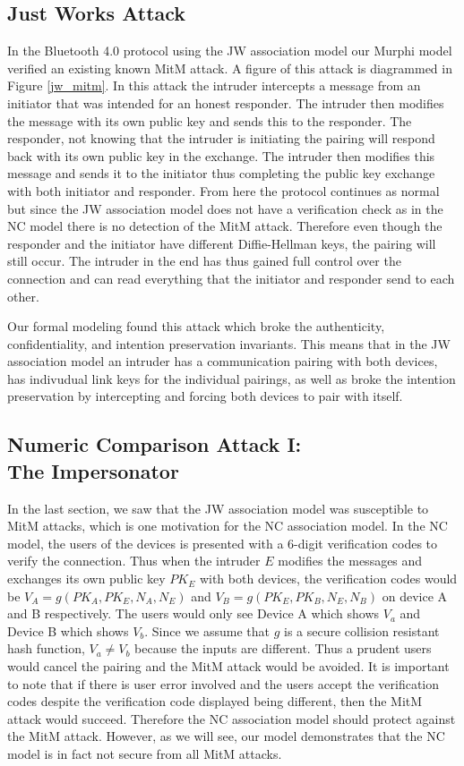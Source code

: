 \documentclass{acm_proc_article-sp}
\begin{document}
\subsection{Just Works Attack}
In the Bluetooth 4.0 protocol using the JW association model our Murphi model verified an existing known MitM attack. A figure of this attack is diagrammed in Figure \ref{jw_mitm}. In this attack the intruder intercepts a message from an initiator that was intended for an honest responder. The intruder then modifies the message with its own public key and sends this to the responder. The responder, not knowing that the intruder is initiating the pairing will respond back with its own public key in the exchange. The intruder then modifies this message and sends it to the initiator thus completing the public key exchange with both initiator and responder. From here the protocol continues as normal but since the JW association model does not have a verification check as in the NC model there is no detection of the MitM attack. Therefore even though the responder and the initiator have different Diffie-Hellman keys, the pairing will still occur. The intruder in the end has thus gained full control over the connection and can read everything that the initiator and responder send to each other.

Our formal modeling found this attack which broke the authenticity, confidentiality, and intention preservation invariants. This means that in the JW association model an intruder has a communication pairing with both devices, has indivudual link keys for the individual pairings, as well as broke the intention preservation by intercepting and forcing both devices to pair with itself.

\subsection{Numeric Comparison Attack I:\\The Impersonator} %
In the last section, we saw that the JW association model was susceptible to MitM attacks, which is one motivation for the NC association model. In the NC model, the users of the devices is presented with a 6-digit verification codes to verify the connection. Thus when the intruder $E$ modifies the messages and exchanges its own public key $PK_E$ with both devices, the verification codes would be $V_A = g(PK_A, PK_E, N_A, N_E)$ and $V_B = g(PK_E, PK_B, N_E, N_B)$ on device A and B respectively. The users would only see Device A which shows $V_a$ and Device B which shows $V_b$. Since we assume that $g$ is a secure collision resistant hash function, $V_a \neq V_b$ because the inputs are different. Thus a prudent users would cancel the pairing and the MitM attack would be avoided. It is important to note that if there is user error involved and the users accept the verification codes despite the verification code displayed being different, then the MitM attack would succeed. Therefore the NC association model should protect against the MitM attack. However, as we will see, our model demonstrates that the NC model is in fact not secure from all MitM attacks.
\end{document}
